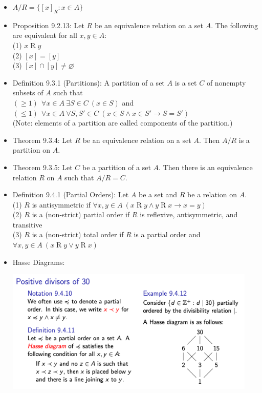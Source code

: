 \documentclass{article}
\begin{document}
\begin{itemize}
\begin{equation*}
        \end{equation*}
    \item $A/R = \{[x]_R:x\in A\}$
    \item Proposition 9.2.13: Let $R$ be an equivalence relation on a set $A$. The following are equivalent for all $x,y\in A$:
        \\ \hspace*{3mm} (1) $x\mathrel{R}y$
        \\ \hspace*{3mm} (2) $[x]=[y]$
        \\ \hspace*{3mm} (3) $[x]\cap[y]\neq \varnothing$
    \item Definition 9.3.1 (Partitions): A partition of a set $A$ is a set $C$ of nonempty subsets of $A$ such that
        \\ \hspace*{3mm} $(\geqslant 1)\ \ \forall x\in A\ \exists S\in C\ (x\in S)$ and
        \\ \hspace*{3mm} $(\leqslant 1)\ \ \forall x\in A\ \forall S,S'\in C\ (x\in S \land x\in S' \xrightarrow{} S=S')$
        \\ (Note: elements of a partition are called components of the partition.)
    \item Theorem 9.3.4: Let $R$ be an equivalence relation on a set $A$. Then $A/R$ is a partition on $A$.
    \item Theorem 9.3.5: Let $C$ be a partition of a set $A$. Then there is an equivalence relation $R$ on $A$ such that $A/R=C$.
    \item Definition 9.4.1 (Partial Orders): Let $A$ be a set and $R$ be a relation on $A$.
        \\ \hspace*{3mm} (1) $R$ is antisymmetric if $\forall x,y\in A\ (x\mathrel{R}y\land y\mathrel{R}x \xrightarrow{} x=y)$
        \\ \hspace*{3mm} (2) $R$ is a (non-strict) partial order if $R$ is reflexive, antisymmetric, and transitive
        \\ \hspace*{3mm} (3) $R$ is a (non-strict) total order if $R$ is a partial order and $\forall x,y\in A\ (x\mathrel{R}y \lor y\mathrel{R}x)$
    \item Hasse Diagrams:
        \begin{center}
            \includegraphics[width=12cm]{images/hassediagram.png}

\end{center}
\end{itemize}
\end{document}
